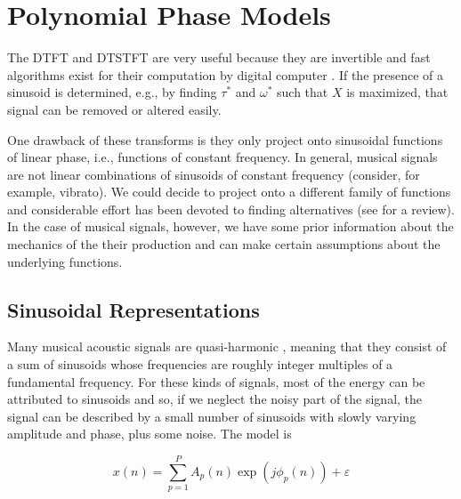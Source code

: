 \section{Polynomial Phase Models\label{sec:polynomphasemodel}}

The DTFT and DTSTFT are very useful because they are invertible
\cite{portnoff1976implementation} and fast algorithms exist for their 
computation by digital computer \cite{van1992computational}. If the presence of
a sinusoid is determined, e.g., by finding $\tau^{\ast}$ and $\omega^{\ast}$ such that
$X$ is maximized, that signal can be removed or altered easily.

One drawback of these transforms is they only project onto sinusoidal functions
of linear phase, i.e., functions of constant frequency. In general, musical
signals are not linear combinations of sinusoids of constant frequency
(consider, for example, vibrato). We could decide to project onto a different
family of functions and considerable effort has been devoted to finding
alternatives (see \cite{kereliuk2011sparse} for a review). In the case of
musical signals, however, we have some prior information about the mechanics of
the their production and can make certain assumptions about the underlying
functions.

\subsection{Sinusoidal Representations\label{sec:mqfmfromphase}} Many musical
acoustic signals are quasi-harmonic \cite{fletcher2012physics}, meaning that
they consist of a sum of sinusoids whose frequencies are roughly integer
multiples of a fundamental frequency. For these kinds of signals, most of the
energy can be attributed to sinusoids and so, if we neglect the noisy part of
the signal, the signal can be described by a small number of sinusoids with
slowly varying amplitude and phase, plus some noise. The model is

\begin{equation}
    \label{eq:sumofsinesampphasesep}
    x(n)=\sum_{p=1}^{P} A_p(n) \exp(j \phi_p(n)) + \varepsilon
\end{equation}

